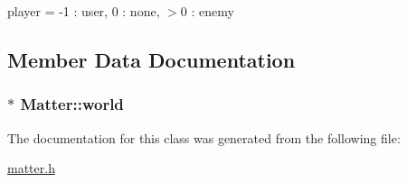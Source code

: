 player = -\/1 \+: user, 0 \+: none, $>$0 \+: enemy 



\subsection{Member Data Documentation}
\hypertarget{classMatter_abdc5b13e2427e41c45af024acae015f1}{}
\subsubsection[{world}]{$\ast$ Matter\+::world\hspace{0.3cm}{\ttfamily [protected]}}\label{classMatter_abdc5b13e2427e41c45af024acae015f1}


The documentation for this class was generated from the following file\+:\begin{DoxyCompactItemize}
\item 
\hyperlink{matter_8h}{matter.\+h}\end{DoxyCompactItemize}
